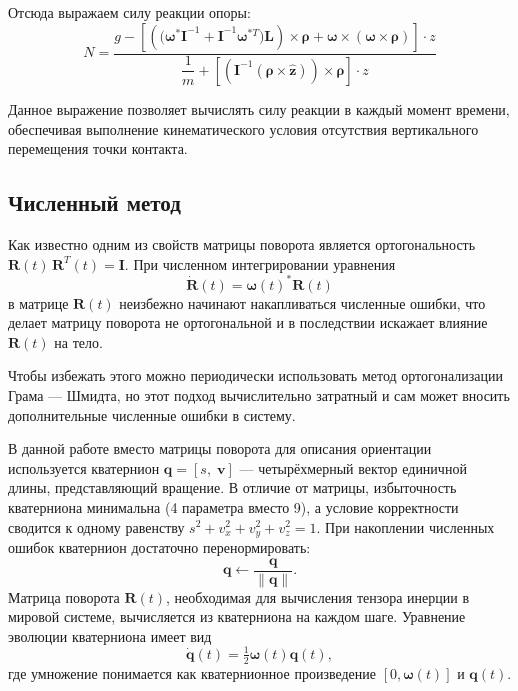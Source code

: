 \documentclass{article}
\begin{document}
Отсюда выражаем силу реакции опоры:
\begin{equation}
N = \dfrac{g - \left[ \left( \bigl( \boldsymbol{\omega}^* \mathbf{I}^{-1} + \mathbf{I}^{-1} \boldsymbol{\omega}^{*T} \bigr) \mathbf{L} \right) \times \boldsymbol{\rho} + \boldsymbol{\omega} \times (\boldsymbol{\omega} \times \boldsymbol{\rho}) \right] \cdot z}{\dfrac{1}{m} + \left[ \left( \mathbf{I}^{-1} (\boldsymbol{\rho} \times \hat{\mathbf{z}}) \right) \times \boldsymbol{\rho} \right] \cdot z}
\end{equation}

Данное выражение позволяет вычислять силу реакции в каждый момент времени, обеспечивая выполнение кинематического условия отсутствия вертикального перемещения точки контакта.

\subsection{Численный метод} 

Как известно одним из свойств матрицы поворота является ортогональность $\mathbf{R}(t)\,\mathbf{R}^T(t) = \mathbf{I}$. При численном интегрировании уравнения 
\[
\dot{\mathbf{R}}(t) = \boldsymbol{\omega}(t)^* {\mathbf{R}}(t)
\]
в матрице ${\mathbf{R}}(t)$ неизбежно начинают накапливаться численные ошибки, что делает матрицу поворота не ортогональной и в последствии искажает влияние ${\mathbf{R}}(t)$ на тело.

Чтобы избежать этого можно периодически использовать метод ортогонализации Грама — Шмидта, но этот подход вычислительно затратный и сам может вносить дополнительные численные ошибки в систему.

В данной работе вместо матрицы поворота для описания ориентации используется 
кватернион $\mathbf{q} = [s,\;\mathbf{v}]$ — четырёхмерный вектор единичной длины, 
представляющий вращение. В отличие от матрицы, избыточность кватерниона минимальна 
(4 параметра вместо 9), а условие корректности сводится к одному равенству 
$s^2 + v_x^2 + v_y^2 + v_z^2 = 1$. При накоплении численных ошибок кватернион 
достаточно перенормировать:
\[
\mathbf{q} \leftarrow \frac{\mathbf{q}}{\|\mathbf{q}\|}.
\]
Матрица поворота $\mathbf{R}(t)$, необходимая для вычисления тензора инерции 
в мировой системе, вычисляется из кватерниона на каждом шаге. 
Уравнение эволюции кватерниона имеет вид
\[
\dot{\mathbf{q}}(t) = \tfrac{1}{2}\boldsymbol{\omega}(t)\mathbf{q}(t),
\]
где умножение понимается как кватернионное произведение $[0,\boldsymbol{\omega}(t)]$ и $\mathbf{q}(t)$.
\end{document}
